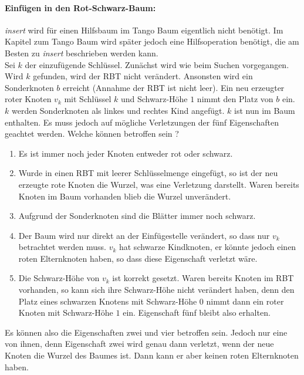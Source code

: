 \documentclass[a4paper,12pt]{article}
\begin{document}
\paragraph{Einfügen in den Rot-Schwarz-Baum:}
\textit{insert} wird für einen Hilfsbaum im Tango Baum eigentlich nicht benötigt. Im Kapitel zum Tango Baum wird später jedoch eine Hilfsoperation benötigt, die am Besten zu \textit{insert} beschrieben werden kann.\\
Sei $k$ der einzufügende Schlüssel. Zunächst wird wie beim Suchen vorgegangen. Wird $k$ gefunden, wird der RBT nicht verändert. Ansonsten wird ein Sonderknoten $b$ erreicht (Annahme der RBT ist nicht leer). Ein neu erzeugter roter Knoten $v_k$ mit Schlüssel $k$ und Schwarz-Höhe $1$ nimmt den Platz von $b$ ein. $k$ werden Sonderknoten als linkes und rechtes Kind angefügt. $k$ ist nun im Baum enthalten. Es muss jedoch auf mögliche Verletzungen der fünf Eigenschaften geachtet werden. Welche können betroffen sein ?

\begin{enumerate}
	\item Es ist immer noch jeder Knoten entweder rot oder schwarz.
	\item Wurde in einen RBT mit leerer Schlüsselmenge eingefügt, so ist der neu erzeugte rote Knoten die Wurzel, was eine Verletzung darstellt. Waren bereits Knoten im Baum vorhanden blieb die Wurzel unverändert.
	\item Aufgrund der Sonderknoten sind die Blätter immer noch schwarz.
	\item Der Baum wird nur direkt an der Einfügestelle verändert, so dass nur $v_k$ betrachtet werden muss. $v_k$ hat schwarze Kindknoten, er könnte jedoch einen roten Elternknoten haben, so dass diese Eigenschaft verletzt wäre.
	\item Die Schwarz-Höhe von $v_k$ ist korrekt gesetzt. Waren bereits Knoten im RBT vorhanden, so kann sich ihre Schwarz-Höhe nicht verändert haben, denn den Platz eines schwarzen Knotens mit Schwarz-Höhe $0$ nimmt dann ein roter Knoten mit Schwarz-Höhe $1$ ein. Eigenschaft fünf bleibt also erhalten. 
\end{enumerate}  

\noindent Es können also die Eigenschaften zwei und vier betroffen sein. Jedoch nur eine von ihnen, denn Eigenschaft zwei wird genau dann verletzt, wenn der neue Knoten die Wurzel des Baumes ist. Dann kann er aber keinen roten Elternknoten haben.
\end{document}
